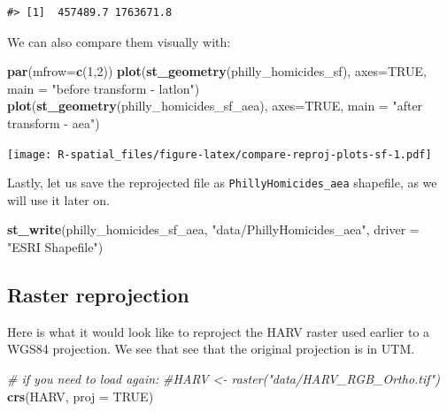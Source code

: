 \documentclass[
]{book}
\newenvironment{Shaded}{\begin{snugshade}}{\end{snugshade}}
\newcommand{\AttributeTok}[1]{\textcolor[rgb]{0.13,0.29,0.53}{#1}}
\newcommand{\CommentTok}[1]{\textcolor[rgb]{0.56,0.35,0.01}{\textit{#1}}}
\newcommand{\ConstantTok}[1]{\textcolor[rgb]{0.56,0.35,0.01}{#1}}
\newcommand{\DecValTok}[1]{\textcolor[rgb]{0.00,0.00,0.81}{#1}}
\newcommand{\FunctionTok}[1]{\textcolor[rgb]{0.13,0.29,0.53}{\textbf{#1}}}
\newcommand{\NormalTok}[1]{#1}
\newcommand{\StringTok}[1]{\textcolor[rgb]{0.31,0.60,0.02}{#1}}
\begin{document}
\begin{verbatim}
#> [1]  457489.7 1763671.8
\end{verbatim}

We can also compare them visually with:

\begin{Shaded}
\begin{Highlighting}[]
\FunctionTok{par}\NormalTok{(}\AttributeTok{mfrow=}\FunctionTok{c}\NormalTok{(}\DecValTok{1}\NormalTok{,}\DecValTok{2}\NormalTok{)) }
\FunctionTok{plot}\NormalTok{(}\FunctionTok{st\_geometry}\NormalTok{(philly\_homicides\_sf), }\AttributeTok{axes=}\ConstantTok{TRUE}\NormalTok{, }\AttributeTok{main =} \StringTok{"before transform {-} latlon"}\NormalTok{)}
\FunctionTok{plot}\NormalTok{(}\FunctionTok{st\_geometry}\NormalTok{(philly\_homicides\_sf\_aea), }\AttributeTok{axes=}\ConstantTok{TRUE}\NormalTok{, }\AttributeTok{main =} \StringTok{"after transform {-} aea"}\NormalTok{)}
\end{Highlighting}
\end{Shaded}

\texttt{[image: R-spatial\_files/figure-latex/compare-reproj-plots-sf-1.pdf]}

Lastly, let us save the reprojected file as \texttt{PhillyHomicides\_aea} shapefile, as we will use it later on.

\begin{Shaded}
\begin{Highlighting}[]
\FunctionTok{st\_write}\NormalTok{(philly\_homicides\_sf\_aea, }\StringTok{"data/PhillyHomicides\_aea"}\NormalTok{, }\AttributeTok{driver =} \StringTok{"ESRI Shapefile"}\NormalTok{)}
\end{Highlighting}
\end{Shaded}

\hypertarget{raster-reprojection}{%
\subsection{Raster reprojection}\label{raster-reprojection}}

Here is what it would look like to reproject the HARV raster used earlier to a WGS84 projection. We see that see that the original projection is in UTM.

\begin{Shaded}
\begin{Highlighting}[]
\CommentTok{\# if you need to load again:}
\CommentTok{\#HARV \textless{}{-} raster("data/HARV\_RGB\_Ortho.tif")}
\FunctionTok{crs}\NormalTok{(HARV, }\AttributeTok{proj =} \ConstantTok{TRUE}\NormalTok{)}
\end{Highlighting}
\end{Shaded}
\end{document}

